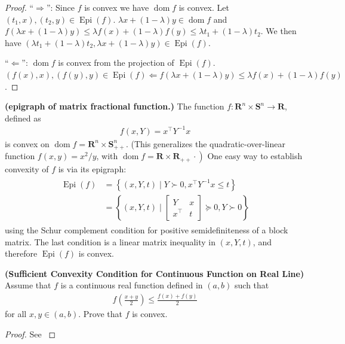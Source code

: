 \documentclass{article}
\newcommand{\bfs}[1]{\textbf{({#1}) }}
\newcommand{\dom}{\operatorname{dom}}
\newcommand{\Epi}{\operatorname{Epi} }
\begin{document}
\begin{proof}\color{ForestGreen}
``$\Rightarrow$'': Since $f$ is convex we have $\dom f$ is convex. Let $(t_1,x),(t_2,y)\in \Epi (f)$. $\lambda x + (1-\lambda) y\in \dom f$ and $f(\lambda x + (1-\lambda) y)\le \lambda f(x) + (1-\lambda)f(y)\le \lambda t_1 + (1-\lambda) t_2$. We then have $( \lambda t_1 + (1-\lambda) t_2, \lambda x + (1-\lambda) y)\in \Epi (f)$.

``$\Leftarrow$'': $\dom f$ is convex from the projection of $\Epi (f)$. $(f(x),x), (f(y),y) \in \Epi(f)\Leftarrow f(\lambda x + (1-\lambda) y)\le \lambda f(x) + (1-\lambda)f(y)$.
\end{proof}
\begin{exma}{\bfs{epigraph of matrix fractional function.}}
The function $f: \mathbf{R}^{n} \times \mathbf{S}^{n} \rightarrow \mathbf{R}$, defined as
\begin{align*}
f(x, Y)=x^{\top} Y^{-1} x
\end{align*}
is convex on $\dom  f=\mathbf{R}^{n} \times \mathbf{S}_{++}^{n}$. (This generalizes the quadratic-over-linear function $f(x, y)=x^{2} / y$, with $\left.\dom  f=\mathbf{R} \times \mathbf{R}_{++} \cdot\right)$
One easy way to establish convexity of $f$ is via its epigraph:
\begin{align*}
\begin{aligned}
\Epi (f) &=\left\{(x, Y, t) \mid Y \succ 0, x^{\top} Y^{-1} x \leq t\right\} \\
&=\left\{(x, Y, t) \mid\left[\begin{array}{cc}
Y & x \\
x^{\top} & t
\end{array}\right] \succeq 0, Y \succ 0\right\}
\end{aligned}
\end{align*}
using the Schur complement condition for positive semidefiniteness of a block matrix. The last condition is a linear matrix inequality in $(x, Y, t)$, and therefore  $\Epi (f)$ is convex.
\end{exma}
\begin{lema}{\bfs{Sufficient Convexity Condition for Continuous Function on Real Line}}
Assume that $f$ is a continuous real function defined in $(a, b)$ such that
\begin{align*}
f\left(\frac{x+y}{2}\right) \leq \frac{f(x)+f(y)}{2}
\end{align*}
for all $x, y \in(a, b) .$ Prove that $f$ is convex.
\end{lema}
\begin{proof}\color{ForestGreen}
See \cite[page 101, ex. 24]{rudin1976principles}
\end{proof}
\end{document}
